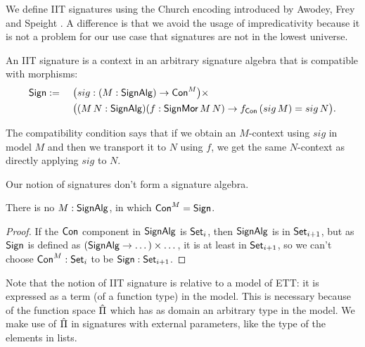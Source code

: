 \documentclass[a4paper,UKenglish,cleveref, autoref]{lipics-v2019}
\begin{document}
We define IIT signatures using the Church encoding introduced by
Awodey, Frey and Speight \cite{DBLP:conf/lics/AwodeyFS18}. A
difference is that we avoid the usage of impredicativity because it is
not a problem for our use case that signatures are not in the lowest
universe.
\begin{definition}\label{defn:sign}
  An IIT signature is a context in an arbitrary signature algebra that
  is compatible with morphisms:
  \begin{alignat*}{6}
    & \mathsf{Sign} :=\,\, && \big({sig}:(M:\mathsf{SignAlg})\rightarrow\mathsf{Con}^M\big)\times \\
    & && \big((M\,N:\mathsf{SignAlg})(f:\mathsf{SignMor}\,M\,N)\rightarrow f_{\mathsf{Con}}\,({sig}\,M) = {sig}\,N \big).
  \end{alignat*}
\end{definition}
The compatibility condition says that if we obtain an $M$-context
using ${sig}$ in model $M$ and then we transport it to $N$ using $f$,
we get the same $N$-context as directly applying ${sig}$ to $N$.

Our notion of signatures don't form a signature algebra.
\begin{lemma}
  There is no $M : \mathsf{SignAlg}$, in which $\mathsf{Con}^M = \mathsf{Sign}$.
\end{lemma}
\begin{proof}
  If the $\mathsf{Con}$ component in $\mathsf{SignAlg}$ is $\mathsf{Set}_i$, then $\mathsf{SignAlg}$
  is in $\mathsf{Set}_{i+1}$, but as $\mathsf{Sign}$ is defined as
  $(\mathsf{SignAlg}\rightarrow\dots)\times\dots$, it is at least in $\mathsf{Set}_{i+1}$, so
  we can't choose $\mathsf{Con}^M : \mathsf{Set}_i$ to be $\mathsf{Sign} : \mathsf{Set}_{i+1}$.
\end{proof}

Note that the notion of IIT signature is relative to a model of ETT:
it is expressed as a term (of a function type) in the model. This is
necessary because of the function space $\hat{\Pi}$ which has as domain an
arbitrary type in the model. We make use of $\hat{\Pi}$ in signatures with
external parameters, like the type of the elements in lists.
\end{document}
